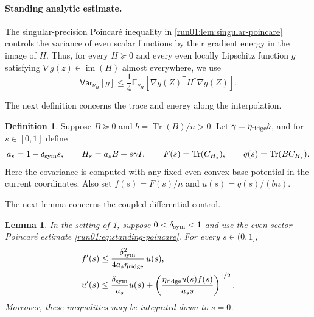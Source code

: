 \documentclass[11pt]{article}
\numberwithin{equation}{section}
\newtheorem{lemma}{Lemma}[section]
\theoremstyle{definition}
\newtheorem{definition}[definition]{Definition}
\newcommand{\E}[2]{\mathbb{E}_{#1}\left[#2\right]}
\newcommand{\V}[2]{\mathsf{Var}_{#1}\left[#2\right]}
\begin{document}
\paragraph{Standing analytic estimate.}
The singular-precision Poincar\'e inequality in
\cref{run01:lem:singular-poincare} controls the variance of even scalar
functions by their gradient energy in the image of $H$.
Thus, for every $H\succeq0$ and every even locally Lipschitz function
$g$ satisfying
$\nabla g(z)\in\operatorname{im}(H)$ almost everywhere, we use
\begin{equation}
 \V{\nu_H}{g}
 \leq\frac14\E{\nu_H}
 {\nabla g(Z)^{\mathsf T} H^\dagger\nabla g(Z)}.
 \label{run01:eq:standing-poincare}
\end{equation}

The next definition concerns the trace and energy along the interpolation.

\begin{definition}
\label{run01:def:interpolation}
Suppose $B\succeq0$ and
$b=\operatorname{Tr}(B)/n>0$.
Let $\gamma=\eta_{\rm ridge}b$, and for
$s\in[0,1]$ define
\[
a_s=1-\delta_{\rm sym}s,
\qquad
H_s=a_sB+s\gamma I,
\qquad
F(s)=\operatorname{Tr}(C_{H_s}),
\qquad
q(s)=\operatorname{Tr}(BC_{H_s}).
\]
Here the covariance is computed with any fixed even convex base potential in the
current coordinates.
Also set $f(s)=F(s)/n$ and
$u(s)=q(s)/(bn)$.
\end{definition}

The next lemma concerns the coupled differential control.

\begin{lemma}
\label{run01:lem:coupled-differential}
In the setting of \cref{run01:def:interpolation}, suppose $0<\delta_{\rm sym}<1$
and use the even-sector Poincar\'e estimate \eqref{run01:eq:standing-poincare}.
For every $s\in(0,1]$,
\begin{align}
 f'(s)
 &\leq \frac{\delta_{\rm sym}^2}{4a_s\eta_{\rm ridge}}\,u(s),
 \label{run01:eq:f-differential}\\
 u'(s)
 &\leq \frac{\delta_{\rm sym}}{a_s}u(s)
   +\left(\frac{\eta_{\rm ridge}u(s)f(s)}{a_s s}\right)^{1/2}.
 \label{run01:eq:u-differential}
\end{align}
Moreover, these inequalities may be integrated down to $s=0$.
\end{lemma}
\end{document}
